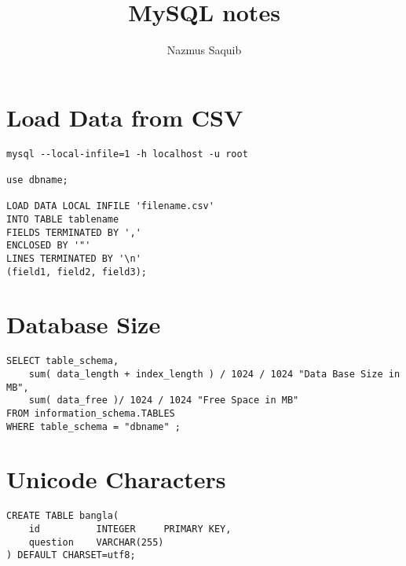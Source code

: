 \documentclass[12pt, a4paper]{article}
\begin{document}
\title{MySQL notes}
\author{Nazmus Saquib}

\maketitle
\tableofcontents

\section{Load Data from CSV}
\begin{verbatim}
mysql --local-infile=1 -h localhost -u root

use dbname;

LOAD DATA LOCAL INFILE 'filename.csv'
INTO TABLE tablename
FIELDS TERMINATED BY ','
ENCLOSED BY '"'
LINES TERMINATED BY '\n'
(field1, field2, field3);
\end{verbatim}

\section{Database Size}
\begin{verbatim}
SELECT table_schema,
    sum( data_length + index_length ) / 1024 / 1024 "Data Base Size in MB",
    sum( data_free )/ 1024 / 1024 "Free Space in MB"
FROM information_schema.TABLES
WHERE table_schema = "dbname" ; 
\end{verbatim}

\section{Unicode Characters}
\begin{verbatim}
CREATE TABLE bangla(
    id          INTEGER     PRIMARY KEY,
    question    VARCHAR(255)
) DEFAULT CHARSET=utf8;
\end{verbatim}
\end{document}
